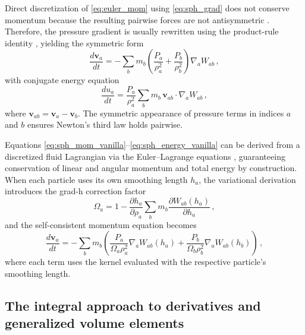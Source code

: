 Direct discretization of \eqref{eq:euler_mom} using \eqref{eq:sph_grad} does not conserve momentum because the resulting pairwise forces are not antisymmetric \cite{Rosswog2009}. Therefore, the pressure gradient is usually rewritten using the product-rule identity%
, yielding the symmetric form
\begin{equation}
    \frac{d\mathbf{v}_a}{dt} = -\sum_b m_b \left( \frac{P_a}{\rho_a^2} + \frac{P_b}{\rho_b^2} \right) \nabla_a W_{ab}\,,
    \label{eq:sph_mom_vanilla}
\end{equation}
with conjugate energy equation
\begin{equation}
    \frac{du_a}{dt} = \frac{P_a}{\rho_a^2} \sum_b m_b \, \mathbf{v}_{ab} \cdot \nabla_a W_{ab}\,,
    \label{eq:sph_energy_vanilla}
\end{equation}
where $\mathbf{v}_{ab} = \mathbf{v}_a - \mathbf{v}_b$. The symmetric appearance of pressure terms in indices $a$ and $b$ ensures Newton's third law holds pairwise.


Equations \eqref{eq:sph_mom_vanilla}--\eqref{eq:sph_energy_vanilla} can be derived from a discretized fluid Lagrangian via the Euler--Lagrange equations \cite{Rosswog2009}, guaranteeing conservation of linear and angular momentum and total energy by construction. When each particle uses its own smoothing length $h_a$, the variational derivation introduces the grad-h correction factor \cite{Rosswog2009}
\begin{equation}
    \Omega_a = 1 - \frac{\partial h_a}{\partial \rho_a} \sum_b m_b \frac{\partial W_{ab}(h_a)}{\partial h_a}\,,
    \label{eq:gradh_omega}
\end{equation}
and the self-consistent momentum equation becomes
\begin{equation}
    \frac{d\mathbf{v}_a}{dt} = -\sum_b m_b \left( \frac{P_a}{\Omega_a \rho_a^2} \nabla_a W_{ab}(h_a) + \frac{P_b}{\Omega_b \rho_b^2} \nabla_a W_{ab}(h_b) \right)\,,
    \label{eq:sph_mom_gradh}
\end{equation}
where each term uses the kernel evaluated with the respective particle's smoothing length.


\subsection{The integral approach to derivatives and generalized volume elements}
\label{sec:iad}

